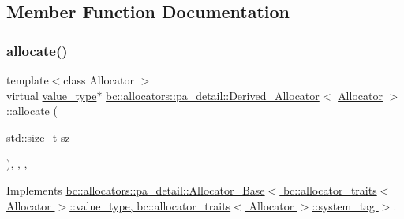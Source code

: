 \subsection{Member Function Documentation}
\mbox{\label{structbc_1_1allocators_1_1pa__detail_1_1Derived__Allocator_acbfe2862777bf8810e925d78c9511a66}} 
\subsubsection{\texorpdfstring{allocate()}{allocate()}}
{\footnotesize\ttfamily template$<$class Allocator $>$ \\
virtual \hyperlink{structbc_1_1allocators_1_1pa__detail_1_1Derived__Allocator_a997c60e64ca7028da4c9eb15b5bf553d}{value\+\_\+type}$\ast$ \hyperlink{structbc_1_1allocators_1_1pa__detail_1_1Derived__Allocator}{bc\+::allocators\+::pa\+\_\+detail\+::\+Derived\+\_\+\+Allocator}$<$ \hyperlink{classbc_1_1allocators_1_1Allocator}{Allocator} $>$\+::allocate (\begin{DoxyParamCaption}\item[{std\+::size\+\_\+t}]{sz }\end{DoxyParamCaption})\hspace{0.3cm}{\ttfamily [inline]}, {\ttfamily [final]}, {\ttfamily [override]}, {\ttfamily [virtual]}}



Implements \hyperlink{structbc_1_1allocators_1_1pa__detail_1_1Allocator__Base_aa22794436cb3abefc059bde0eb08a23f}{bc\+::allocators\+::pa\+\_\+detail\+::\+Allocator\+\_\+\+Base$<$ bc\+::allocator\+\_\+traits$<$ Allocator $>$\+::value\+\_\+type, bc\+::allocator\+\_\+traits$<$ Allocator $>$\+::system\+\_\+tag $>$}.

\mbox{\label{structbc_1_1allocators_1_1pa__detail_1_1Derived__Allocator_af11b1d876a4b0f7c7eb54231730eb3a8}} 
